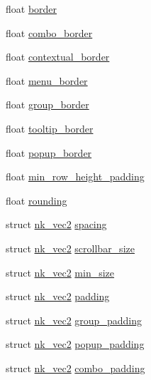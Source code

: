 \begin{DoxyCompactItemize}
float \mbox{\hyperlink{structnk__style__window_ad7fa0f645e10ec7bc6d62692e6d6edf9}{border}}
\item 
float \mbox{\hyperlink{structnk__style__window_a5ef574e571d5e4726852ad2f65c3bbaa}{combo\+\_\+border}}
\item 
float \mbox{\hyperlink{structnk__style__window_ac4916772640d3241438c20c4a8ba0e50}{contextual\+\_\+border}}
\item 
float \mbox{\hyperlink{structnk__style__window_a21ca38bdb7f780cf8d02e3f400397219}{menu\+\_\+border}}
\item 
float \mbox{\hyperlink{structnk__style__window_a01f2264c6f00fbfb81418c14bcccdb84}{group\+\_\+border}}
\item 
float \mbox{\hyperlink{structnk__style__window_a9b989c066564f6af652248abcbc342f6}{tooltip\+\_\+border}}
\item 
float \mbox{\hyperlink{structnk__style__window_af8e78775dddd67f9e55ee160f8943a38}{popup\+\_\+border}}
\item 
float \mbox{\hyperlink{structnk__style__window_a8015008fdc925c60cda1a81688eb9017}{min\+\_\+row\+\_\+height\+\_\+padding}}
\item 
float \mbox{\hyperlink{structnk__style__window_a9be123b10d86541aa71dcb88272df015}{rounding}}
\item 
struct \mbox{\hyperlink{structnk__vec2}{nk\+\_\+vec2}} \mbox{\hyperlink{structnk__style__window_a890814c49e4b1da0c311b1c1521c508c}{spacing}}
\item 
struct \mbox{\hyperlink{structnk__vec2}{nk\+\_\+vec2}} \mbox{\hyperlink{structnk__style__window_a22a4285cab4e629d1a22ffb5e4fa31b8}{scrollbar\+\_\+size}}
\item 
struct \mbox{\hyperlink{structnk__vec2}{nk\+\_\+vec2}} \mbox{\hyperlink{structnk__style__window_af285fb50f2acd6562706b97ee3233b0c}{min\+\_\+size}}
\item 
struct \mbox{\hyperlink{structnk__vec2}{nk\+\_\+vec2}} \mbox{\hyperlink{structnk__style__window_a445b869eddbbe4883259f03263fc49df}{padding}}
\item 
struct \mbox{\hyperlink{structnk__vec2}{nk\+\_\+vec2}} \mbox{\hyperlink{structnk__style__window_a86d3a9f2f90380097f15b5abf09b0254}{group\+\_\+padding}}
\item 
struct \mbox{\hyperlink{structnk__vec2}{nk\+\_\+vec2}} \mbox{\hyperlink{structnk__style__window_a88ba604ec88fc6120dc7df0450b55a6c}{popup\+\_\+padding}}
\item 
struct \mbox{\hyperlink{structnk__vec2}{nk\+\_\+vec2}} \mbox{\hyperlink{structnk__style__window_a83a35e01cad6096a632917eec64e78d7}{combo\+\_\+padding}}

\end{DoxyCompactItemize}
